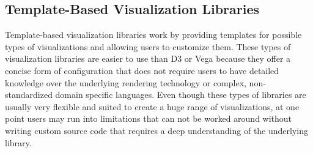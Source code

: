 





\subsection{Template-Based Visualization Libraries}

Template-based visualization libraries work by providing templates for possible types of visualizations and allowing users to customize them. 
These types of visualization libraries are easier to use than D3 or Vega because they offer a concise form of configuration that does not require users to have detailed knowledge over the underlying rendering technology or complex, non-standardized domain specific languages. 
Even though these types of libraries are usually very flexible and suited to create a huge range of visualizations, at one point users may run into limitations that can not be worked around without writing custom source code that requires a deep understanding of the underlying library. 

